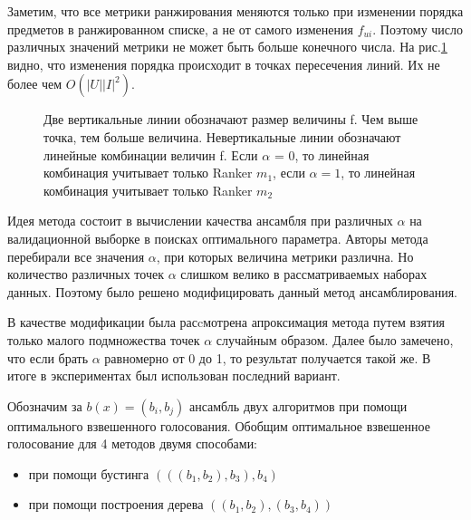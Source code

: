 \documentclass[14pt]{extarticle}
\begin{document}
	Заметим, что все метрики ранжирования меняются только при изменении порядка предметов в ранжированном списке, а не от самого изменения $f_{ui}$. Поэтому число различных значений метрики не может быть больше конечного числа. На рис.\ref{pic:latexpic} видно, что изменения порядка происходит в точках пересечения линий. Их  не более чем $O(|U||I|^2)$. 

\begin{figure}[h]
\caption{Две вертикальные линии обозначают размер величины f. Чем выше точка, тем больше величина. Невертикальные линии обозначают линейные комбинации величин f. Если $\alpha$ = 0, то линейная комбинация учитывает только Ranker $m_1$, если $\alpha = 1$, то  линейная комбинация учитывает только Ranker $m_2$}
\label{pic:latexpic}
\end{figure}
	
	Идея метода состоит в вычислении качества ансамбля при различных $\alpha$ на валидационной выборке в поисках оптимального параметра\cite{learningrank1,learningrank2}. Авторы метода перебирали все значения $\alpha$, при которых величина метрики различна. Но количество различных точек $\alpha$ слишком велико в рассматриваемых наборах данных. Поэтому было решено  модифицировать данный метод ансамблирования. 
	
	В качестве модификации была расcмотрена апроксимация метода путем взятия только малого подмножества точек $\alpha$ случайным образом. Далее было замечено, что если брать $\alpha$ равномерно от 0 до 1, то результат получается такой же. В итоге в экспериментах был использован последний вариант.

	
	Обозначим за $b(x) = (b_i, b_j)$ ансамбль двух алгоритмов при помощи оптимального взвешенного голосования. 
	Обобщим оптимальное взвешенное голосование для 4 методов двумя способами:
	\begin{itemize}
	\item при помощи бустинга $(((b_1, b_2), b_3), b_4)$
	\item при помощи построения дерева $((b_1,b_2), (b_3, b_4))$
	\end{itemize}
	
\end{document}
